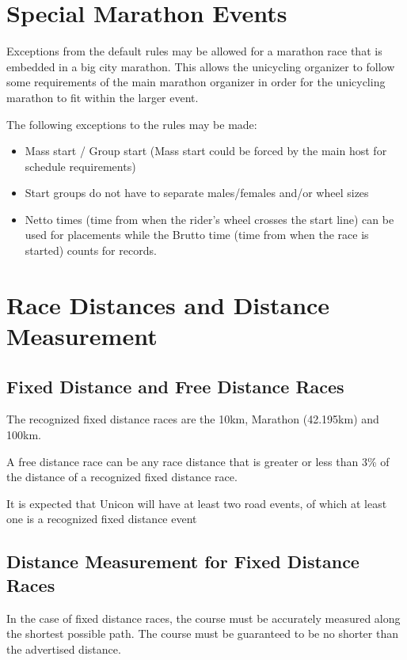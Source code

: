 \section{Special Marathon Events}

Exceptions from the default rules may be allowed for a marathon race that is embedded in a big city marathon.%
This allows the unicycling organizer to follow some requirements of the main marathon organizer in order for the unicycling marathon to fit within the larger event.

The following exceptions to the rules may be made:
\begin{itemize}
\item Mass start / Group start (Mass start could be forced by the main host for schedule requirements)
\item Start groups do not have to separate males/females and/or wheel sizes
\item Netto times (time from when the rider's wheel crosses the start line) can be used for placements while the Brutto time (time from when the race is started) counts for records.
\end{itemize}

\section{Race Distances and Distance Measurement}

\subsection{Fixed Distance and Free Distance Races}

The recognized fixed distance races are the 10km, Marathon (42.195km) and 100km.

A free distance race can be any race distance that is greater or less than 3\% of the distance of a recognized fixed distance race.

It is expected that Unicon will have at least two road events, of which at least one is a recognized fixed distance event

\subsection {Distance Measurement for Fixed Distance Races}

In the case of fixed distance races, the course must be accurately measured along the shortest possible path.
The course must be guaranteed to be no shorter than the advertised distance.

